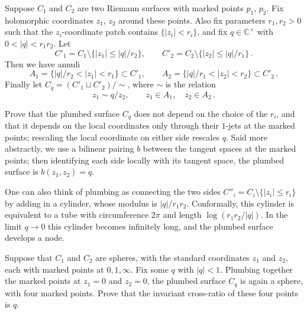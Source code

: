 \documentclass[12pt,letterpaper,reqno]{amsart}
\numberwithin{equation}{section}
\newcommand{\bbC}{\ensuremath{\mathbb C}}
\newcommand{\abs}[1]{\lvert#1\rvert}
\begin{document}

\begin{defn}
Suppose $C_1$ and $C_2$ are two Riemann surfaces with marked points $p_1$, $p_2$. Fix holomorphic coordinates $z_1$, $z_2$ around these points. Also fix parameters $r_1, r_2 > 0$ such that the $z_i$-coordinate patch contains $\{ \abs{z_i} < r_i \}$, 
and fix $q \in \bbC^\times$ with $0 < \abs{q} < r_1 r_2$.
Let
\begin{equation}
  C'_1 = C_1 \setminus \{\abs{z_1} \le \abs{q} / r_2\}, \qquad  
  C'_2 = C_2 \setminus \{\abs{z_2} \le \abs{q} / r_1\}  \, .
\end{equation}
Then we have annuli 
\begin{equation}
 A_1 = \{ \abs{q} / r_2 < \abs{z_1} < r_1  \} \subset C'_1, \qquad A_2 = \{ \abs{q} / r_1 < \abs{z_2} < r_2  \} \subset C'_2 \, .
\end{equation}
Finally let $C_q = (C'_1 \sqcup C'_2) / \sim$,
where $\sim$ is the relation
\begin{equation}
  z_1 \sim q / z_2, \qquad z_1 \in A_1, \quad z_2 \in A_2 \, .
\end{equation}
\end{defn}

\begin{exercise}
Prove that the plumbed surface 
$C_q$ does not depend on the choice of the $r_i$,
and that it depends on the local coordinates only through their $1$-jets at the marked points; rescaling the local coordinate on
either side rescales $q$. Said more abstractly, we use a bilinear pairing $b$ between the tangent spaces at the 
marked points; then identifying each side locally with its tangent space, the plumbed surface is $b(z_1,z_2) = q$.
\end{exercise}

One can also think of plumbing as connecting the two sides
$C''_i = C_i \setminus \{\abs{z_i} \le r_i \}$ by adding in 
a cylinder, whose modulus is $\abs{q} / r_1 r_2$.
Conformally, this cylinder is equivalent to a tube with circumference 
$2 \pi$ and length $\log (r_1 r_2 / \abs{q})$. In the limit $q \to 0$ this cylinder becomes infinitely long, and the plumbed surface develops
a node.


\begin{exercise}
Suppose that $C_1$ and $C_2$ are spheres, with the
standard coordinates $z_1$ and $z_2$,
each with marked points at $0,1,\infty$. Fix some $q$ 
with $\abs{q} < 1$. Plumbing together the 
marked points at $z_1=0$ and $z_2=0$,
the plumbed surface $C_q$ is again a sphere, with
four marked points. Prove that the invariant cross-ratio 
of these four points is $q$.
\end{exercise}
\end{document}
